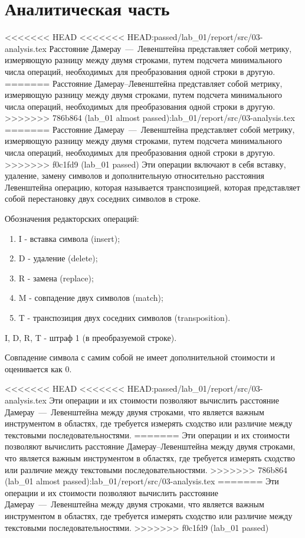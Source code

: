 \section{Аналитическая часть}

<<<<<<< HEAD
<<<<<<< HEAD:passed/lab_01/report/src/03-analysis.tex
Расстояние Дамерау~---~Левенштейна представляет собой метрику, измеряющую разницу между двумя строками, путем подсчета минимального числа операций, необходимых для преобразования одной строки в другую.
=======
Расстояние Дамерау--Левенштейна представляет собой метрику, измеряющую разницу между двумя строками, путем подсчета минимального числа операций, необходимых для преобразования одной строки в другую.
>>>>>>> 786b864 (lab_01 almost passed):lab_01/report/src/03-analysis.tex
=======
Расстояние Дамерау~---~Левенштейна представляет собой метрику, измеряющую разницу между двумя строками, путем подсчета минимального числа операций, необходимых для преобразования одной строки в другую.
>>>>>>> f0c1fd9 (lab_01 passed)
Эти операции включают в себя вставку, удаление, замену символов и дополнительную относительно расстояния Левенштейна операцию, которая называется транспозицией, которая представляет собой перестановку двух соседних символов в строке. \cite{cyberleninka_modifitsirovannyi_algoritm}

Обозначения редакторских операций:
\begin{enumerate}
	\item I - вставка символа (insert);
	\item D - удаление (delete);
	\item R - замена (replace);
	\item M - совпадение двух символов (match);
	\item T - транспозиция двух соседних символов (transposition).
\end{enumerate}
I, D, R, T - штраф 1 (в преобразуемой строке).

Совпадение символа с самим собой не имеет дополнительной стоимости и оценивается как 0.

<<<<<<< HEAD
<<<<<<< HEAD:passed/lab_01/report/src/03-analysis.tex
Эти операции и их стоимости позволяют вычислить расстояние Дамерау~---~Левенштейна между двумя строками, что является важным инструментом в областях, где требуется измерять сходство или различие между текстовыми последовательностями.
=======
Эти операции и их стоимости позволяют вычислить расстояние Дамерау--Левенштейна между двумя строками, что является важным инструментом в областях, где требуется измерять сходство или различие между текстовыми последовательностями.
>>>>>>> 786b864 (lab_01 almost passed):lab_01/report/src/03-analysis.tex
=======
Эти операции и их стоимости позволяют вычислить расстояние Дамерау~---~Левенштейна между двумя строками, что является важным инструментом в областях, где требуется измерять сходство или различие между текстовыми последовательностями.
>>>>>>> f0c1fd9 (lab_01 passed)

